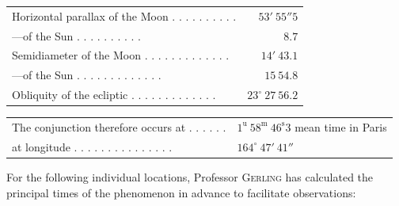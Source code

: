 \begin{center}\small\setlength{\tabcolsep}{3pt}
\begin{tabular}{lr}
Horizontal parallax of the Moon . . . . . . . . . . & $53'\ 55''5$ \\
\hspace{1em}---\hspace{1em}of the Sun . . . . . . . . . . & $8.7$ \\
Semidiameter of the Moon . . . . . . . . . . . . . & $14'\ 43.1$ \\
\hspace{1em}---\hspace{1em}of the Sun . . . . . . . . . . . . . & $15\ 54.8$ \\
Obliquity of the ecliptic . . . . . . . . . . . . . & $23^\circ\ 27\ 56.2$ \\
\end{tabular}
\begin{tabular}{ll}
The conjunction therefore occurs at . . . . . . & $1^{\mathrm u}\ 58^{\mathrm m}\ 46^{\mathrm s}3$ mean time in Paris \\
at longitude . . . . . . . . . . . . . . . & $164^\circ\ 47'\ 41''$ \\
\end{tabular}
\end{center}

For the following individual locations, Professor \textsc{Gerling} has calculated the principal times of the phenomenon in advance to facilitate observations:

